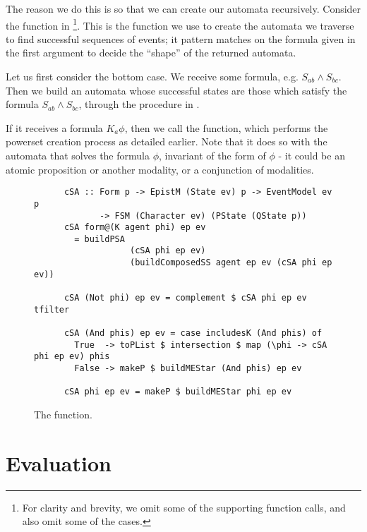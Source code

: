 \documentclass[10pt, a4paper]{report}
\begin{document}


The reason we do this is so that we can create our automata recursively.
Consider the function in \footnote{For clarity
  and brevity, we omit some of the supporting function calls, and also omit some
  of the cases.}. This is the function we use to create the automata we traverse
to find successful sequences of events; it pattern matches on the formula given
in the first argument to decide the ``shape'' of the returned automata.

Let us first consider the bottom case. We receive some formula, e.g. $S_{ab}
\land S_{bc}$. Then we build an automata \mestar whose successful states are
those which satisfy the formula $S_{ab} \land S_{bc}$, through the procedure in
. 

If it receives a formula $K_a \phi$, then we call the 
function, which performs the powerset creation process as detailed earlier. Note
that it does so with the automata that solves the formula $\phi$, invariant of
the form of $\phi$ - it could be an atomic proposition or another modality, or a
conjunction of modalities. 

\begin{figure}[h]
  \centering
    \begin{verbatim}
      cSA :: Form p -> EpistM (State ev) p -> EventModel ev p
             -> FSM (Character ev) (PState (QState p))
      cSA form@(K agent phi) ep ev
        = buildPSA 
                   (cSA phi ep ev) 
                   (buildComposedSS agent ep ev (cSA phi ep ev)) 

      cSA (Not phi) ep ev = complement $ cSA phi ep ev tfilter

      cSA (And phis) ep ev = case includesK (And phis) of
        True  -> toPList $ intersection $ map (\phi -> cSA phi ep ev) phis
        False -> makeP $ buildMEStar (And phis) ep ev

      cSA phi ep ev = makeP $ buildMEStar phi ep ev
    \end{verbatim}
  \caption{The  function.}
  \label{fig:createSolvingAutomata}
\end{figure}

\newpage

\chapter{Evaluation}
\end{document}
